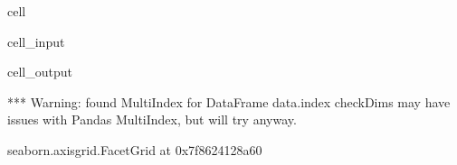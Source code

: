 \documentclass[letterpaper,table,10pt,english]{jupyterBook}
\begin{document}
\begin{sphinxuseclass}{cell}\begin{sphinxVerbatimInput}

\begin{sphinxuseclass}{cell_input}
\begin{sphinxVerbatim}[commandchars=\\\{\}]
  
     
                 
                     
\end{sphinxVerbatim}

\end{sphinxuseclass}\end{sphinxVerbatimInput}
\begin{sphinxVerbatimOutput}

\begin{sphinxuseclass}{cell_output}
\begin{sphinxVerbatim}[commandchars=\\\{\}]
*** Warning: found MultiIndex for DataFrame data.index \PYGZhy{} checkDims may have issues with Pandas MultiIndex, but will try anyway.
\end{sphinxVerbatim}

\begin{sphinxVerbatim}[commandchars=\\\{\}]
\PYGZlt{}seaborn.axisgrid.FacetGrid at 0x7f8624128a60\PYGZgt{}
\end{sphinxVerbatim}

\noindent{}

\end{sphinxuseclass}\end{sphinxVerbatimOutput}

\end{sphinxuseclass}
\end{document}
